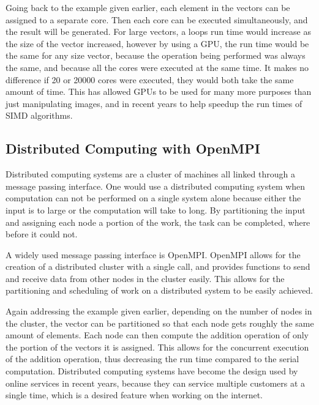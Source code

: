 Going back to the example given earlier, each element in the vectors can be assigned to a separate core. Then each core can be executed simultaneously, and the result will be generated. For large vectors, a loops run time would increase as the size of the vector increased, however by using a GPU, the run time would be the same for any size vector, because the operation being performed was always the same, and because all the cores were executed at the same time. It makes no difference if 20 or 20000 cores were executed, they would both take the same amount of time. This has allowed GPUs to be used for many more purposes than just manipulating images, and in recent years to help speedup the run times of SIMD algorithms.

\subsection{Distributed Computing with OpenMPI}
Distributed computing systems are a cluster of machines all linked through a message passing interface. One would use a distributed computing system when computation can not be performed on a single system alone because either the input is to large or the computation will take to long. By partitioning the input and assigning each node a portion of the work, the task can be completed, where before it could not.

A widely used message passing interface is OpenMPI. OpenMPI allows for the creation of a distributed cluster with a single call, and provides functions to send and receive data from other nodes in the cluster easily. This allows for the partitioning and scheduling of work on a distributed system to be easily achieved.

Again addressing the example given earlier, depending on the number of nodes in the cluster, the vector can be partitioned so that each node gets roughly the same amount of elements. Each node can then compute the addition operation of only the portion of the vectors it is assigned. This allows for the concurrent execution of the addition operation, thus decreasing the run time compared to the serial computation. Distributed computing systems have become the design used by online services in recent years, because they can service multiple customers at a single time, which is a desired feature when working on the internet.